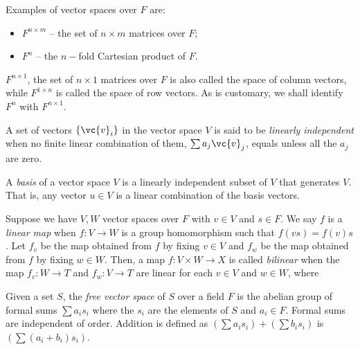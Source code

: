 Examples of vector spaces over $F$ are:
\begin{itemize}
  \item $F^{n\times m}$ -- the set of $n\times m$ matrices over $F$;
  \item $F^n$ -- the $n{-}$fold Cartesian product of $F$.
\end{itemize}

$F^{n\times 1}$, the set of $n\times 1$
matrices over $F$ is also called the space of column vectors, while $F^{1\times n}$ is called the
space of row vectors. As is customary, we shall identify $F^n$ with $F^{n\times 1}$.

\begin{definition}\label{def:linearly_independent}
  A set of vectors $\{\vc{v}_i\}$ in the vector space $V$ is said to be \emph{linearly
  independent} when no finite linear combination of them, $\sum a_j\vc{v}_j$, equals  unless
  all the $a_j$ are zero.

\end{definition}

\begin{definition}\label{def:basis}
  A \emph{basis} of a vector space $V$ is a linearly independent subset of $V$ that generates $V$.
  That is, any vector $u \in V$ is a linear combination of the basis vectors.
\end{definition}

\begin{definition}\label{def:linear_map_of_vector_spaces}
  Suppose we have $V, W$ vector spaces over $F$ with $v \in V$ and $s \in F$. We say $f$ is a
  \emph{linear map} when $f:V \to W$ is a group homomorphism such that $f(v s) = f(v)s$. Let
  $f_v$ be the
  map obtained from $f$ by fixing $v\in V$ and $f_w$ be the map obtained from $f$ by fixing  $w\in W$.
  Then, a map $f:V\times W \to X$ is called \emph{bilinear} when the
  map $f_v:W\to T$ and $f_w:V\to T$ are linear for each $v\in V$ and $w\in W$, where
\end{definition}

\begin{definition}\label{def:free_vector_space}
  Given a set $S$, the \emph{free vector space} of $S$ over a field $F$ is the abelian group
  of formal sums $\sum a_i s_i$ where the $s_i$ are the elements of $S$ and $a_i \in F$.
  Formal sums are independent of order. Addition is defined as $(\sum a_i s_i) + (\sum b_i s_i)$ is
  $(\sum (a_i + b_i) s_i)$.
\end{definition}

